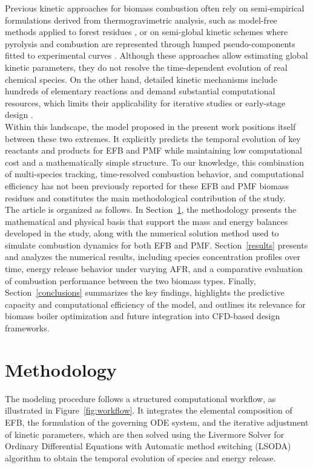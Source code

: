 \documentclass[preprint,12pt]{elsarticle}
\begin{document}
Previous kinetic approaches for biomass combustion often rely on semi-empirical formulations derived from thermogravimetric analysis, such as model-free methods applied to forest residues \cite{Dhaundiyal2019}, or on semi-global kinetic schemes where pyrolysis and combustion are represented through lumped pseudo-components fitted to experimental curves \cite{DiCelso2014}. Although these approaches allow estimating global kinetic parameters, they do not resolve the time-dependent evolution of real chemical species. On the other hand, detailed kinetic mechanisms include hundreds of elementary reactions and demand substantial computational resources, which limits their applicability for iterative studies or early-stage design \cite{Silva2023}.\\

Within this landscape, the model proposed in the present work positions itself between these two extremes. It explicitly predicts the temporal evolution of key reactants and products for EFB and PMF while maintaining low computational cost and a mathematically simple structure. To our knowledge, this combination of multi-species tracking, time-resolved combustion behavior, and computational efficiency has not been previously reported for these EFB and PMF biomass residues and constitutes the main methodological contribution of the study.\\

The article is organized as follows. In Section~\ref{methodology}, the methodology presents the mathematical and physical basis that support the mass and energy balances developed in the study, along with the numerical solution method used to simulate combustion dynamics for both EFB and PMF. Section~\ref{results} presents and analyzes the numerical results, including species concentration profiles over time, energy release behavior under varying AFR, and a comparative evaluation of combustion performance between the two biomass types. Finally, Section~\ref{conclusions} summarizes the key findings, highlights the predictive capacity and computational efficiency of the model, and outlines its relevance for biomass boiler optimization and future integration into CFD-based design frameworks.

\section{Methodology} \label{methodology}

The modeling procedure follows a structured computational workflow, as illustrated in Figure~\ref{fig:workflow}. It integrates the elemental composition of EFB, the formulation of the governing ODE system, and the iterative adjustment of kinetic parameters, which are then solved using the Livermore Solver for Ordinary Differential Equations with Automatic method switching (LSODA) algorithm to obtain the temporal evolution of species and energy release.
\end{document}
